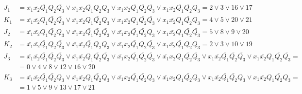\documentclass[listings]{labreport}
\begin{document}
\begin{align*}
J_1 & = \bar{x_1}\bar{x_2}\bar{Q_1}Q_2\bar{Q_3} \lor \bar{x_1}\bar{x_2}\bar{Q_1}Q_2Q_3 \lor x_1\bar{x_2}\bar{Q_1}\bar{Q_2}\bar{Q_3} \lor x_1\bar{x_2}\bar{Q_1}\bar{Q_2}Q_3 = 2 \lor 3 \lor 16 \lor 17 \\
K_1 & = \bar{x_1}\bar{x_2}Q_1\bar{Q_2}\bar{Q_3} \lor \bar{x_1}\bar{x_2}Q_1\bar{Q_2}Q_3 \lor x_1\bar{x_2}Q_1\bar{Q_2}\bar{Q_3} \lor x_1\bar{x_2}Q_1\bar{Q_2}Q_3 = 4 \lor 5 \lor 20 \lor 21 \\
J_2 & = \bar{x_1}\bar{x_2}Q_1\bar{Q_2}Q_3 \lor \bar{x_1}x_2\bar{Q_1}\bar{Q_2}\bar{Q_3} \lor \bar{x_1}x_2\bar{Q_1}\bar{Q_2}Q_3 \lor x_1\bar{x_2}Q_1\bar{Q_2}\bar{Q_3} = 5 \lor 8 \lor 9 \lor 20 \\
K_2 & = \bar{x_1}\bar{x_2}\bar{Q_1}Q_2\bar{Q_3} \lor \bar{x_1}\bar{x_2}\bar{Q_1}Q_2Q_3 \lor \bar{x_1}x_2\bar{Q_1}Q_2\bar{Q_3} \lor x_1\bar{x_2}\bar{Q_1}Q_2Q_3 = 2 \lor 3 \lor 10 \lor 19 \\
J_3 & = \bar{x_1}\bar{x_2}\bar{Q_1}\bar{Q_2}\bar{Q_3} \lor \bar{x_1}\bar{x_2}Q_1\bar{Q_2}\bar{Q_3} \lor \bar{x_1}x_2\bar{Q_1}\bar{Q_2}\bar{Q_3} \lor \bar{x_1}x_2Q_1\bar{Q_2}\bar{Q_3} \lor x_1\bar{x_2}\bar{Q_1}\bar{Q_2}\bar{Q_3} \lor x_1\bar{x_2}Q_1\bar{Q_2}\bar{Q_3} = \\ & = 0 \lor 4 \lor 8 \lor 12 \lor 16 \lor 20 \\
K_3 & = \bar{x_1}\bar{x_2}\bar{Q_1}\bar{Q_2}Q_3 \lor \bar{x_1}\bar{x_2}Q_1\bar{Q_2}Q_3 \lor \bar{x_1}x_2\bar{Q_1}\bar{Q_2}Q_3 \lor \bar{x_1}x_2Q_1\bar{Q_2}Q_3 \lor x_1\bar{x_2}\bar{Q_1}\bar{Q_2}Q_3 \lor x_1\bar{x_2}Q_1\bar{Q_2}Q_3 = \\ & = 1 \lor 5 \lor 9 \lor 13 \lor 17 \lor 21
\end{align*}
\end{document}
